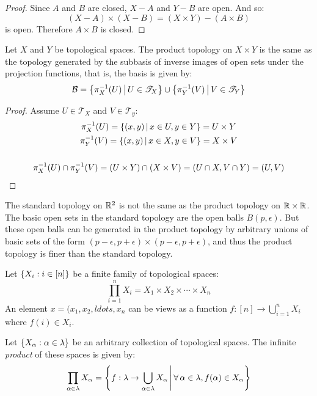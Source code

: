 \documentclass[letterpaper,12pt,fleqn]{article}
\newcommand{\p}{\pi}
\newcommand{\B}{\mathcal{B}}
\newcommand{\T}{\mathscr{T}}
\newcommand{\e}{\epsilon}
\renewcommand{\a}{\alpha}
\renewcommand{\l}{\lambda}
\begin{document}
\begin{proof}
  Since \(A\) and \(B\) are closed, \(X-A\) and \(Y-B\) are open.  And so:
  \[(X-A)\times(X-B)=(X\times Y)-(A\times B)\]
  is open.  Therefore \(A\times B\) is closed.
\end{proof}

\begin{theorem}
  Let \(X\) and \(Y\) be topological spaces.  The product topology on \(X\times Y\) is the same as the topology
  generated by the subbasis of inverse images of open sets under the projection functions, that is, the basis is
  given by:
  \[\B=\setb{\p_X^{-1}(U)}{U\in\T_X}\cup\setb{\p_Y^{-1}(V)}{V\in\T_Y}\]
\end{theorem}

\begin{proof}
  Assume \(U\in\T_X\) and \(V\in\T_y\):
  \begin{gather*}
    \p_X^{-1}(U)=\setb{(x,y)}{x\in U,y\in Y}=U\times Y \\
    \p_Y^{-1}(V)=\setb{(x,y)}{x\in X,y\in V}=X\times V \\
    \\
    \p_X^{-1}(U)\cap\p_Y^{-1}(V)=(U\times Y)\cap(X\times V)=(U\cap X,V\cap Y)=(U,V)
  \end{gather*}
\end{proof}

\begin{example}
  The standard topology on \(\mathbb{R}^2\) is not the same as the product topology on \(\mathbb{R}\times\mathbb{R}\).  The basic open sets
  in the standard topology are the open balls \(B(p,\e)\).  But these open balls can be generated in the product
  topology by arbitrary unions of basic sets of the form \((p-\e,p+\e)\times(p-\e,p+\e)\), and thus the product
  topology is finer than the standard topology.
\end{example}

\begin{notation}
  Let \(\{X_i:i\in[n]\}\) be a finite family of topological spaces:
  \[\prod_{i=1}^nX_i=X_1\times X_2\times\cdots\times X_n\]
  An element \(x=(x_1,x_2,ldots,x_n\) can be views as a function \(f:[n]\to\bigcup_{i=1}^nX_i\) where
  \(f(i)\in X_i\).
\end{notation}

\begin{definition}
  Let \(\set{X_{\a}:\a\in\l}\) be an arbitrary collection of topological spaces.  The infinite \emph{product} of
  these spaces is given by:
  \[\prod_{\a\in\l}X_{\a}=\setb{f:\l\to\bigcup_{\a\in\l}X_{\a}}{\forall\,\a\in\l,f(\a)\in X_{\a}}\]
\end{definition}
\end{document}
